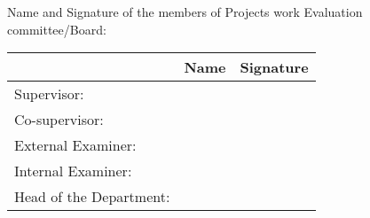 \vspace{0.3cm}

Name and Signature of the members of Projects work Evaluation committee/Board:

\begin{tabular}{|l|m{5.5cm}|m{4cm}|}
	\hline
	& Name & Signature \\ \hline
	Supervisor: & \sup & \\ \hline
	Co-supervisor: & \cosup & \\ \hline
	External Examiner: & & \\ \hline
	Internal Examiner: & & \\ \hline
	Head of the Department: & \hod & \\ \hline
\end{tabular}

{\\
}















